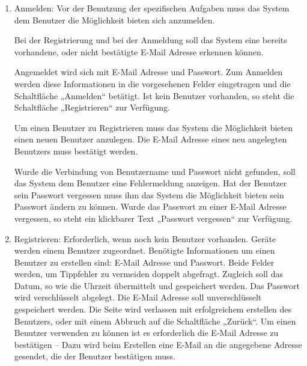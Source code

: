 \documentclass[pointlessnumbers]{scrartcl}
\begin{document}
\begin{enumerate}
\item Anmelden: 
Vor der Benutzung der spezifischen Aufgaben muss das System dem Benutzer die Möglichkeit bieten sich anzumelden.

Bei der Registrierung und bei der Anmeldung soll das System eine bereits vorhandene, oder nicht bestätigte E-Mail Adresse erkennen können.

Angemeldet wird sich mit E-Mail Adresse und Passwort. Zum Anmelden werden diese Informationen in die vorgesehenen Felder eingetragen und die Schaltfläche „Anmelden“ betätigt. Ist kein Benutzer vorhanden, so steht die Schaltfläche „Registrieren“ zur Verfügung.

Um einen Benutzer zu Registrieren muss das System die Möglichkeit bieten einen neuen Benutzer anzulegen. Die E-Mail Adresse eines neu angelegten Benutzers muss bestätigt werden.

Wurde die Verbindung von Benutzername und Passwort nicht gefunden, soll das System dem Benutzer eine Fehlermeldung anzeigen. Hat der Benutzer sein Passwort vergessen muss ihm das System die Möglichkeit bieten sein Passwort ändern zu können. Wurde das Passwort zu einer E-Mail Adresse vergessen, so steht ein klickbarer Text „Passwort vergessen“ zur Verfügung. 


\item Registrieren: Erforderlich, wenn noch kein Benutzer vorhanden. Geräte werden einem Benutzer zugeordnet. Benötigte Informationen um einen Benutzer zu erstellen sind: E-Mail Adresse und Passwort. Beide Felder werden, um Tippfehler zu vermeiden doppelt abgefragt. Zugleich soll das Datum, so wie die Uhrzeit übermittelt und gespeichert werden. Das Passwort wird verschlüsselt abgelegt. Die E-Mail Adresse soll unverschlüsselt gespeichert werden. Die Seite wird verlassen mit erfolgreichem erstellen des Benutzers, oder mit einem Abbruch auf die Schaltfläche „Zurück“. Um einen Benutzer verwenden zu können ist es erforderlich die E-Mail Adresse zu bestätigen – Dazu wird beim Erstellen eine E-Mail an die angegebene Adresse gesendet, die der Benutzer bestätigen muss. 


\end{enumerate}
\end{document}
